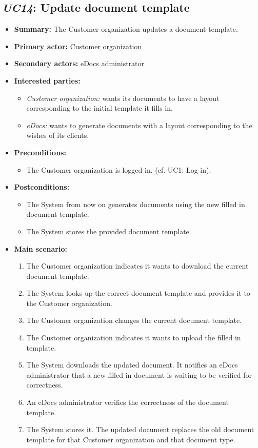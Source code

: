 \documentclass[a4paper,10pt]{article}
\begin{document}
\subsection{\emph{UC14}: Update document template}
\begin{itemize}
	\item \textbf{Summary:} The Customer organization updates a document template.
    \item \textbf{Primary actor:} Customer organization
    \item \textbf{Secondary actors:} eDocs administrator
    \item \textbf{Interested parties:} 
        \begin{itemize}
            \item \textit{Customer organization:} wants its documents to have a layout corresponding to the initial template it fills in.
            \item \textit{eDocs:} wants to generate documents with a layout corresponding to the wishes of its clients.
        \end{itemize}

    \item \textbf{Preconditions:}
        \begin{itemize}
            \item The Customer organization is logged in. (cf. UC1: Log in).
        \end{itemize}

    \item \textbf{Postconditions:}
        \begin{itemize}
            \item The System from now on generates documents using the new filled in document template.
            \item The System stores the provided document template.
        \end{itemize}
        
    \item \textbf{Main scenario:} 
    \begin{enumerate}
       \item The Customer organization indicates it wants to download the current document template.
       \item The System looks up the correct document template and provides it to the Customer organization.
       \item The Customer organization changes the current document template.
       \item The Customer organization indicates it wants to upload the filled in template.
       \item The System downloads the updated document. It notifies an eDocs administrator that a new filled in document is waiting to be verified for correctness.
       \item An eDocs administrator verifies the correctness of the document template.
       \item The System stores it. The updated document replaces the old document template for that Customer organization and that document type.
    \end{enumerate}


\end{itemize}
\end{document}
